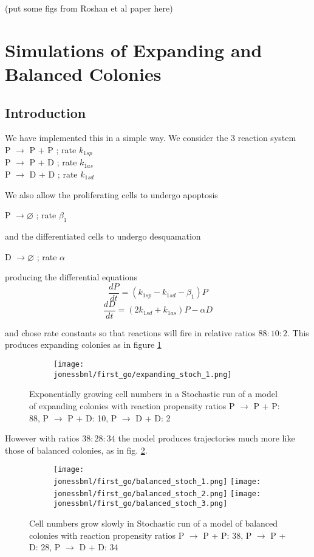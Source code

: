\documentclass[a4paper,10pt]{report}
\newcommand{\psortbase}{/home/ngrs2/work/bsu/PSORT_Zuliani_Reynolds/}
\newcommand{\sbmlbase}{\psortbase/sbml-sh/}
\newcommand{\jonessbml}{\sbmlbase/jones_like}
\begin{document}
(put some figs from Roshan et al paper here) 

\section{Simulations of Expanding and Balanced Colonies}

\subsection{Introduction}
We have implemented this in a simple way. We consider the 3 reaction system \\
P $\rightarrow$ P + P ; rate $k_{1sp}$\\
P $\rightarrow$ P + D ; rate $k_{1as}$ \\
P $\rightarrow$ D + D ; rate $k_{1sd}$

We also allow the proliferating cells to undergo apoptosis 

P $\longrightarrow \varnothing$  ; rate $\beta_1$

and the differentiated cells to undergo desquamation

D $\longrightarrow \varnothing$  ; rate $\alpha$

producing the differential equations
\[
\frac{dP}{dt} = (k_{1sp} - k_{1sd} - \beta_1) P
\]
\[
\frac{dD}{dt} = (2 k_{1sd} + k_{1as}) P - \alpha D 
\]

and chose rate constants so that reactions will fire in relative ratios
$88:10:2$. This produces expanding colonies as in figure \ref{fig:joneslike_fixed_expand}


\begin{figure}[h!]
  \begin{subfigure}{\textwidth}
    \texttt{[image: \\jonessbml/first\_go/expanding\_stoch\_1.png]}
  \end{subfigure}
  \caption{Exponentially growing cell numbers in a Stochastic run of a model of expanding colonies with reaction propensity ratios P $\rightarrow$ P + P: 88, P $\rightarrow$ P + D: 10, P $\rightarrow$ D + D: 2}
  \label{fig:joneslike_fixed_expand}
\end{figure}

However with ratios $38:28:34$ the model produces trajectories much more like those of balanced colonies, as in fig. \ref{fig:joneslike_fixed_balanced}.

\begin{figure}[h!]
  \begin{subfigure}{\textwidth}
    \texttt{[image: \\jonessbml/first\_go/balanced\_stoch\_1.png]}
    \texttt{[image: \\jonessbml/first\_go/balanced\_stoch\_2.png]}
    \texttt{[image: \\jonessbml/first\_go/balanced\_stoch\_3.png]}
  \end{subfigure}
  \caption{Cell numbers grow slowly in Stochastic run of a model of balanced colonies with reaction propensity ratios P $\rightarrow$ P + P: 38, P $\rightarrow$ P + D: 28, P $\rightarrow$ D + D: 34}
  \label{fig:joneslike_fixed_balanced}
\end{figure}
\end{document}

